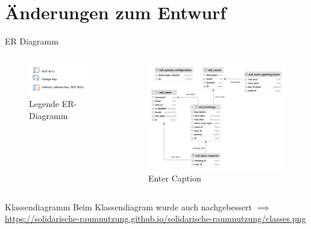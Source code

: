 \documentclass{sdqbeamer}
\begin{document}
\section{Änderungen zum Entwurf}
\begin{frame}{ER Diagramm}
\begin{columns}
    \begin{figure}
       
        \centering
    \includegraphics[width=1\linewidth]{ERLegend.png}
\caption{Legende ER-Diagramm}
    \label{fig:enter-label}
    \end{figure}
     \begin{figure}
        \centering
        \includegraphics[width=0.75\linewidth]{database_new.png}
        \caption{Enter Caption}
        \label{fig:enter-label}
    \end{figure}
\end{columns}


   
\end{frame}

\begin{frame}{Klassendiagramm}
    Beim Klassendiagram wurde auch nachgebessert
    \hfill \break
    \hfill \break
    $\implies$ \url{https://solidarische-raumnutzung.github.io/solidarische-raumnutzung/classes.png} 
\end{frame}
\end{document}

